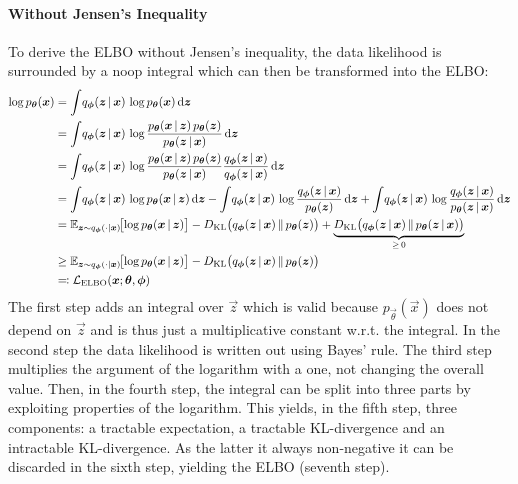 				\paragraph{Without Jensen's Inequality}
					To derive the ELBO without Jensen's inequality, the data likelihood is surrounded by a noop integral which can then be transformed into the ELBO:
					\begin{align}
						\log p_{\vec{\theta}}(\vec{x})
							&= \int\! q_{\vec{\phi}}(\vec{z} \given \vec{x}) \, \log p_{\vec{\theta}}(\vec{x}) \dd{\vec{z}} \\
							&= \int\! q_{\vec{\phi}}(\vec{z} \given \vec{x}) \, \log \frac{p_{\vec{\theta}}(\vec{x} \given \vec{z}) \, p_{\vec{\theta}}(\vec{z})}{p_{\vec{\theta}}(\vec{z} \given \vec{x})} \dd{\vec{z}} \\
							&= \int\! q_{\vec{\phi}}(\vec{z} \given \vec{x}) \, \log \frac{p_{\vec{\theta}}(\vec{x} \given \vec{z}) \, p_{\vec{\theta}}(\vec{z})}{p_{\vec{\theta}}(\vec{z} \given \vec{x})} \frac{q_{\vec{\phi}}(\vec{z} \given \vec{x})}{q_{\vec{\phi}}(\vec{z} \given \vec{x})} \dd{\vec{z}} \\
							&= \int\! q_{\vec{\phi}}(\vec{z} \given \vec{x}) \, \log p_{\vec{\theta}}(\vec{x} \given \vec{z}) \dd{\vec{z}} - \int\! q_{\vec{\phi}}(\vec{z} \given \vec{x}) \, \log \frac{q_{\vec{\phi}}(\vec{z} \given \vec{x})}{p_{\vec{\theta}}(\vec{z})} \dd{\vec{z}} + \int\! q_{\vec{\phi}}(\vec{z} \given \vec{x}) \, \log \frac{q_{\vec{\phi}}(\vec{z} \given \vec{x})}{p_{\vec{\theta}}(\vec{z} \given \vec{x})} \dd{\vec{z}} \\
							&= \E_{\vec{z} \sim q_{\vec{\phi}}(\cdot \subgiven \vec{x})}\!\big[\! \log p_{\vec{\theta}}(\vec{x} \given \vec{z}) \big] - D_\mathrm{KL}\big( q_{\vec{\phi}}(\vec{z} \given \vec{x}) \,\Vert\, p_{\vec{\theta}}(\vec{z}) \big) + \underbrace{D_\mathrm{KL}\big( q_{\vec{\phi}}(\vec{z} \given \vec{x}) \,\Vert\, p_{\vec{\theta}}(\vec{z} \given \vec{x}) \big)}_{\geq\, 0} \\
							&\geq \E_{\vec{z} \sim q_{\vec{\phi}}(\cdot \subgiven \vec{x})}\!\big[\! \log p_{\vec{\theta}}(\vec{x} \given \vec{z}) \big] - D_\mathrm{KL}\big( q_{\vec{\phi}}(\vec{z} \given \vec{x}) \,\Vert\, p_{\vec{\theta}}(\vec{z}) \big) \\
							&\eqqcolon \mathcal{L}_\mathrm{ELBO}(\vec{x}; \vec{\theta}, \vec{\phi})
					\end{align}
					The first step adds an integral over \(\vec{z}\) which is valid because \( p_{\vec{\theta}}(\vec{x}) \) does not depend on \(\vec{z}\) and is thus just a multiplicative constant w.r.t. the integral. In the second step the data likelihood is written out using Bayes' rule. The third step multiplies the argument of the logarithm with a one, not changing the overall value. Then, in the fourth step, the integral can be split into three parts by exploiting properties of the logarithm. This yields, in the fifth step, three components: a tractable expectation, a tractable KL-divergence and an intractable KL-divergence. As the latter it always non-negative it can be discarded in the sixth step, yielding the ELBO (seventh step).

